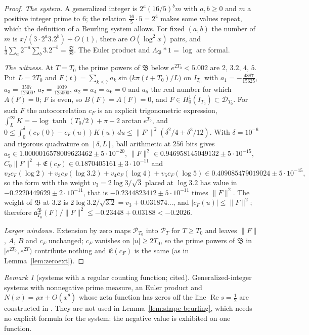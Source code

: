 \documentclass[11pt]{amsart}
\theoremstyle{definition}
\theoremstyle{remark}
\newtheorem{remark}[theorem]{Remark}
\newcommand{\Rel}{\operatorname{Re}}
\newcommand{\PT}{\mathcal P_T}
\newcommand{\cF}{c_F}
\newcommand{\Lev}{\mathfrak E}
\begin{document}
\begin{proof}
\emph{The system.} A generalized integer is $2^a(16/5)^bm$ with $a,b\ge0$ and $m$ a positive integer prime to $6$; the relation
$\frac{16}5\cdot5=2^4$ makes some values repeat, which the definition of a Beurling system allows. For fixed $(a,b)$ the number of $m$ is
$x/(3\cdot2^a3.2^b)+O(1)$, there are $O(\log^2x)$ pairs, and $\frac13\sum_a2^{-a}\sum_b3.2^{-b}=\frac{32}{33}$. The Euler product and
$\Lambda_{\mathfrak B}*1=\log$ are formal.

\emph{The witness.} At $T=T_0$ the prime powers of $\mathfrak B$ below $e^{2T_0}<5.002$ are $2,\,3.2,\,4,\,5$. Put $L=2T_0$ and
$F(t)=\sum_{k\le7}a_k\sin\!\big(k\pi(t+T_0)/L\big)$ on $I_{T_0}$ with
$a_1=-\frac{4887}{15625}$, $a_3=\frac{3507}{12500}$, $a_7=\frac{1039}{125000}$, $a_2=a_4=a_6=0$ and $a_5$ the real number for which
$A(F)=0$; $F$ is even, so $B(F)=A(F)=0$, and $F\in H^1_0(I_{T_0})\subset\mathcal D_{T_0}$. For such $F$ the autocorrelation $\cF$ is an explicit
trigonometric expression, $\int_{L}^\infty K=-\log\tanh(T_0/2)+\pi-2\arctan e^{T_0}$, and
$0\le\int_0^\delta(\cF(0)-\cF(u))K(u)\,du\le\|F'\|^2(\delta^2/4+\delta^3/12)$. With $\delta=10^{-6}$ and rigorous quadrature on $[\delta,L]$,
ball arithmetic at $256$ bits gives $a_5\in1.0000016578009623462\pm5\cdot10^{-20}$, $\|F\|^2\in0.946958145049132\pm5\cdot10^{-15}$,
$C_0\|F\|^2+\Lev(\cF)\in0.1870405161\pm3\cdot10^{-11}$ and
\[
v_2\cF(\log2)+v_3\cF(\log3.2)+v_4\cF(\log4)+v_5\cF(\log5)\in0.409085479019024\pm5\cdot10^{-15},
\]
so the form with the weight $v_3=2\log3/\sqrt3$ placed at $\log3.2$ has value in $-0.2220449629\pm2\cdot10^{-11}$, that is
$-0.2344823412\pm5\cdot10^{-11}$ times $\|F\|^2$. The weight of $\mathfrak B$ at $3.2$ is $2\log3.2/\sqrt{3.2}=v_3+0.031874\ldots$, and
$|\cF(u)|\le\|F\|^2$; therefore $\mathfrak a_{T_0}^{\mathfrak B}(F)/\|F\|^2\le-0.23448+0.03188<-0.2026$.

\emph{Larger windows.} Extension by zero maps $\mathcal P_{T_0}$ into $\PT$ for $T\ge T_0$ and leaves $\|F\|$, $A$, $B$ and $\cF$ unchanged;
$\cF$ vanishes on $|u|\ge2T_0$, so the prime powers of $\mathfrak B$ in $[e^{2T_0},e^{2T})$ contribute nothing and $\Lev(\cF)$ is the same
(as in Lemma~\ref{lem:zeroext}).
\end{proof}
\begin{remark}[systems with a regular counting function; cited]\label{rem:shape-beurling-DZ}
Generalized-integer systems with nonnegative prime measure, an Euler product and $N(x)=\rho x+O(x^\theta)$ whose zeta function has zeros
off the line $\Rel s=\frac12$ are constructed in \cite{DiamondZhang2016}. They are not used in Lemma~\ref{lem:shape-beurling}, which needs no
explicit formula for the system: the negative value is exhibited on one function.
\end{remark}
\end{document}
